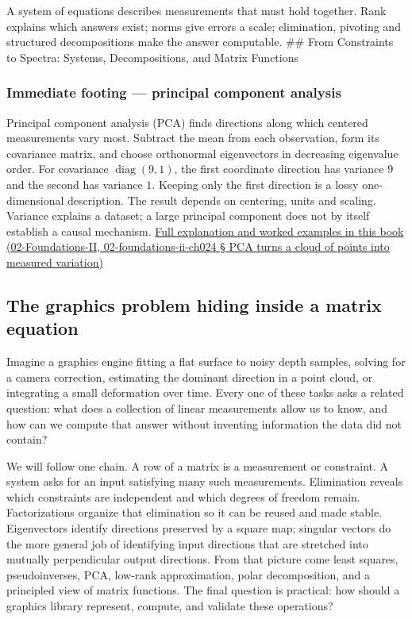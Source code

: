 A system of equations describes measurements that must hold together. Rank explains which answers exist; norms give errors a scale; elimination, pivoting and structured decompositions make the answer computable. \#\# From Constraints to Spectra: Systems, Decompositions, and Matrix Functions

\subsubsection{Immediate footing --- principal component analysis}\label{immediate-footing-principal-component-analysis}

Principal component analysis (PCA) finds directions along which centered measurements vary most. Subtract the mean from each observation, form its covariance matrix, and choose orthonormal eigenvectors in decreasing eigenvalue order. For covariance \(\operatorname{diag}(9,1)\), the first coordinate direction has variance \(9\) and the second has variance \(1\). Keeping only the first direction is a lossy one-dimensional description. The result depends on centering, units and scaling. Variance explains a dataset; a large principal component does not by itself establish a causal mechanism. \href{}{Full explanation and worked examples in this book (02-Foundations-II, 02-foundations-ii-ch024 § PCA turns a cloud of points into measured variation)}

\subsection{The graphics problem hiding inside a matrix equation}\label{the-graphics-problem-hiding-inside-a-matrix-equation}

Imagine a graphics engine fitting a flat surface to noisy depth samples, solving for a camera correction, estimating the dominant direction in a point cloud, or integrating a small deformation over time. Every one of these tasks asks a related question: what does a collection of linear measurements allow us to know, and how can we compute that answer without inventing information the data did not contain?

We will follow one chain. A row of a matrix is a measurement or constraint. A system asks for an input satisfying many such measurements. Elimination reveals which constraints are independent and which degrees of freedom remain. Factorizations organize that elimination so it can be reused and made stable. Eigenvectors identify directions preserved by a square map; singular vectors do the more general job of identifying input directions that are stretched into mutually perpendicular output directions. From that picture come least squares, pseudoinverses, PCA, low-rank approximation, polar decomposition, and a principled view of matrix functions. The final question is practical: how should a graphics library represent, compute, and validate these operations?

